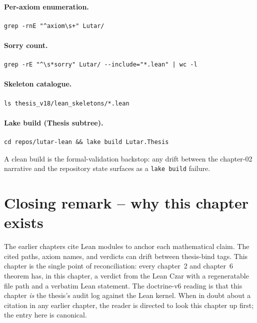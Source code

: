 \paragraph{Per-axiom enumeration.}
\begin{verbatim}
grep -rnE "^axiom\s+" Lutar/
\end{verbatim}

\paragraph{Sorry count.}
\begin{verbatim}
grep -rE "^\s*sorry" Lutar/ --include="*.lean" | wc -l
\end{verbatim}

\paragraph{Skeleton catalogue.}
\begin{verbatim}
ls thesis_v18/lean_skeletons/*.lean
\end{verbatim}

\paragraph{Lake build (Thesis subtree).}
\begin{verbatim}
cd repos/lutar-lean && lake build Lutar.Thesis
\end{verbatim}

A clean build is the formal-validation backstop: any drift between
the chapter-02 narrative and the repository state surfaces as a
\texttt{lake build} failure.

\section*{Closing remark -- why this chapter exists}

The earlier chapters cite Lean modules to anchor each mathematical
claim. The cited paths, axiom names, and verdicts can drift between
thesis-bind tags. This chapter is the single point of reconciliation:
every chapter~2 and chapter~6 theorem has, in this chapter, a
verdict from the Lean Czar with a regeneratable file path and a
verbatim Lean statement. The doctrine-v6 reading is that this
chapter \emph{is} the thesis's audit log against the Lean kernel.
When in doubt about a citation in any earlier chapter, the reader is
directed to look this chapter up first; the entry here is canonical.
